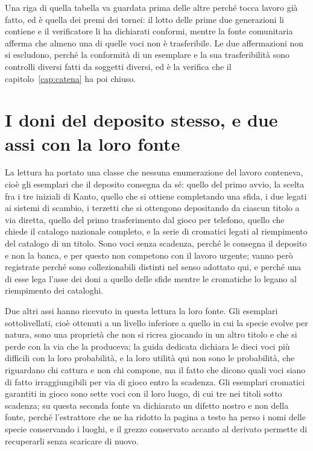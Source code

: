 Una riga di quella tabella va guardata prima delle altre perché tocca lavoro già fatto, ed è quella dei premi dei tornei: il lotto delle prime due generazioni li contiene e il verificatore li ha dichiarati conformi, mentre la fonte comunitaria afferma che almeno una di quelle voci non è trasferibile. Le due affermazioni non si escludono, perché la conformità di un esemplare e la sua trasferibilità sono controlli diversi fatti da soggetti diversi, ed è la verifica che il capitolo~\ref{cap:catena} ha poi chiuso.

\section{I doni del deposito stesso, e due assi con la loro fonte}

La lettura ha portato una classe che nessuna enumerazione del lavoro conteneva, cioè gli esemplari che il deposito consegna da sé: quello del primo avvio, la scelta fra i tre iniziali di Kanto, quello che si ottiene completando una sfida, i due legati ai sistemi di scambio, i terzetti che si ottengono depositando da ciascun titolo a via diretta, quello del primo trasferimento dal gioco per telefono, quello che chiede il catalogo nazionale completo, e la serie di cromatici legati al riempimento del catalogo di un titolo. Sono voci senza scadenza, perché le consegna il deposito e non la banca, e per questo non competono con il lavoro urgente; vanno però registrate perché sono collezionabili distinti nel senso adottato qui, e perché una di esse lega l'asse dei doni a quello delle sfide mentre le cromatiche lo legano al riempimento dei cataloghi.

Due altri assi hanno ricevuto in questa lettura la loro fonte. Gli esemplari sottolivellati, cioè ottenuti a un livello inferiore a quello in cui la specie evolve per natura, sono una proprietà che non si ricrea giocando in un altro titolo e che si perde con la via che la produceva; la guida dedicata \cite{sottolivellati} dichiara le dieci voci più difficili con la loro probabilità, e la loro utilità qui non sono le probabilità, che riguardano chi cattura e non chi compone, ma il fatto che dicono quali voci siano di fatto irraggiungibili per via di gioco entro la scadenza. Gli esemplari cromatici garantiti in gioco sono sette voci con il loro luogo, di cui tre nei titoli sotto scadenza; su questa seconda fonte va dichiarato un difetto nostro e non della fonte, perché l'estrattore che ne ha ridotto la pagina a testo ha perso i nomi delle specie conservando i luoghi, e il grezzo conservato accanto al derivato permette di recuperarli senza scaricare di nuovo.

